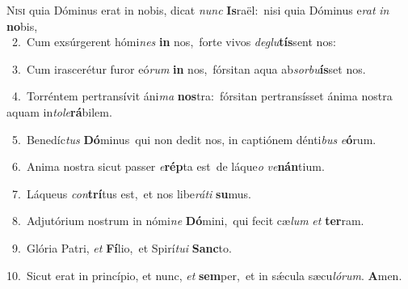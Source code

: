 \lettrine{\initial\textcolor{\initialcolor}{N}}{isi} quia Dóminus erat in nobis, dicat \textit{nunc} \textbf{Is}\-raël:~\star nisi quia Dóminus e\textit{rat} \textit{in} \textbf{no}\-bis,\\
{\numbfont\textcolor{\numbcolor}{~2.}}~Cum exsúrgerent hómi\textit{nes} \textbf{in} nos,~\star forte vivos \textit{de}\-\textit{glu}\textbf{tís}sent nos:\par
{\numbfont\textcolor{\numbcolor}{~3.}}~Cum irascerétur furor eó\textit{rum} \textbf{in} nos,~\star fórsitan aqua ab\-\textit{sor}\-\textit{bu}\textbf{ís}set nos.\par
{\numbfont\textcolor{\numbcolor}{~4.}}~Torréntem pertransívit áni\textit{ma} \textbf{nos}\-tra:~\star fórsitan pertransísset ánima nostra aquam in\-\textit{to}\-\textit{le}\textbf{rá}bilem.\par
{\numbfont\textcolor{\numbcolor}{~5.}}~Benedíc\textit{tus} \textbf{Dó}\-minus~\star qui non dedit nos, in captiónem dénti\textit{bus} \textit{e}\-\textbf{ó}rum.\par
{\numbfont\textcolor{\numbcolor}{~6.}}~Anima nostra sicut passer \textit{e}\-\textbf{rép}ta est~\star de láque\textit{o} \textit{ve}\-\textbf{nán}tium.\par
{\numbfont\textcolor{\numbcolor}{~7.}}~Láqueus \textit{con}\-\textbf{trí}tus est,~\star et nos libe\-\textit{rá}\-\textit{ti} \textbf{su}\-mus.\par
{\numbfont\textcolor{\numbcolor}{~8.}}~Adjutórium nostrum in nómi\textit{ne} \textbf{Dó}\-mini,~\star qui fecit cæ\textit{lum} \textit{et} \textbf{ter}\-ram.\par
{\numbfont\textcolor{\numbcolor}{~9.}}~Glória Patri, \textit{et} \textbf{Fí}\-lio,~\star et Spirí\-\textit{tu}\-\textit{i} \textbf{Sanc}\-to.\par
{\numbfont\textcolor{\numbcolor}{10.}}~Sicut erat in princípio, et nunc, \textit{et} \textbf{sem}\-per,~\star et in sǽcula sæcu\-\textit{ló}\-\textit{rum}. \textbf{A}\-men.\par
